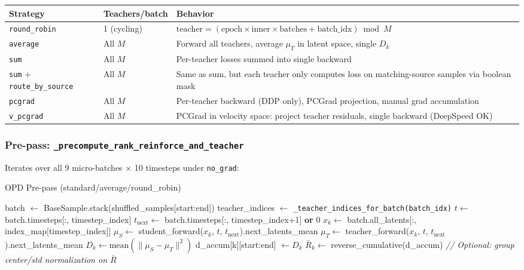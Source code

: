 \documentclass[11pt]{article}
\begin{document}
\begin{table}[h]
\centering
\small
\begin{tabular}{llp{7cm}}
\toprule
Strategy & Teachers/batch & Behavior \\
\midrule
\texttt{round\_robin} & 1 (cycling) & $\text{teacher} = (\text{epoch} \times \text{inner} \times \text{batches} + \text{batch\_idx}) \bmod M$ \\
\texttt{average} & All $M$ & Forward all teachers, average $\mu_T$ in latent space, single $D_k$ \\
\texttt{sum} & All $M$ & Per-teacher losses summed into single backward \\
\texttt{sum} + \texttt{route\_by\_source} & All $M$ & Same as sum, but each teacher only computes loss on matching-source samples via boolean mask \\
\texttt{pcgrad} & All $M$ & Per-teacher backward (DDP only), PCGrad projection, manual grad accumulation \\
\texttt{v\_pcgrad} & All $M$ & PCGrad in velocity space: project teacher residuals, single backward (DeepSpeed OK) \\
\bottomrule
\end{tabular}
\end{table}

\subsubsection{Pre-pass: \texttt{\_precompute\_rank\_reinforce\_and\_teacher}}

Iterates over all 9 micro-batches $\times$ 10 timesteps under \texttt{no\_grad}:

\begin{algorithm}[H]
\caption{OPD Pre-pass (standard/average/round\_robin)}
\begin{algorithmic}
    \STATE batch $\leftarrow$ BaseSample.stack(shuffled\_samples[start:end]) 
    \STATE teacher\_indices $\leftarrow$ \texttt{\_teacher\_indices\_for\_batch(batch\_idx)}
        \STATE $t \leftarrow$ batch.timesteps[:, timestep\_index]
        \STATE $t_\text{next} \leftarrow$ batch.timesteps[:, timestep\_index+1] \textbf{or} 0
        \STATE $x_k \leftarrow$ batch.all\_latents[:, index\_map[timestep\_index]]
        \STATE $\mu_S \leftarrow$ student\_forward($x_k$, $t$, $t_\text{next}$).next\_latents\_mean
        \STATE $\mu_T \leftarrow$ teacher\_forward($x_k$, $t$, $t_\text{next}$).next\_latents\_mean 
        \STATE $D_k \leftarrow \text{mean}(\|\mu_S - \mu_T\|^2)$ 
        \STATE d\_accum[k][start:end] $\leftarrow D_k$
    \ENDFOR
\ENDFOR
\STATE $\bar{R}_k \leftarrow$ reverse\_cumulative(d\_accum) 
\STATE \textit{// Optional: group center/std normalization on $\bar{R}$}
\end{algorithmic}
\end{algorithm}
\end{document}
